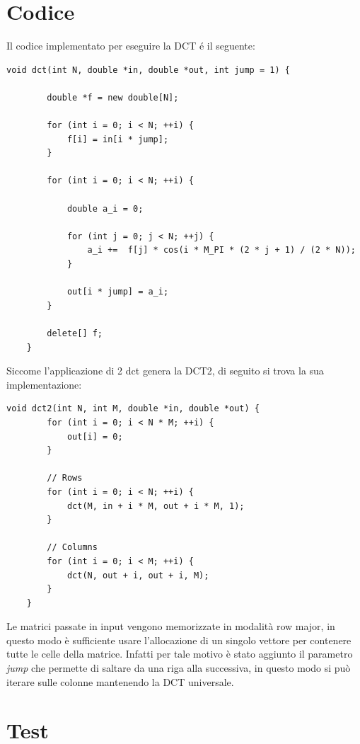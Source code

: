 \section{Codice}

Il codice implementato per eseguire la DCT é il seguente:


\begin{lstlisting}[gobble=1]
	void dct(int N, double *in, double *out, int jump = 1) {
		
		double *f = new double[N];
		
		for (int i = 0; i < N; ++i) {
			f[i] = in[i * jump];
		}
		
		for (int i = 0; i < N; ++i) {
			
			double a_i = 0;
			
			for (int j = 0; j < N; ++j) {
				a_i +=  f[j] * cos(i * M_PI * (2 * j + 1) / (2 * N));
			}
			
			out[i * jump] = a_i;
		}
		
		delete[] f;
	}
\end{lstlisting}

Siccome l'applicazione di 2 dct genera la DCT2, di seguito si trova la sua implementazione:

\begin{lstlisting}[gobble=1]
	void dct2(int N, int M, double *in, double *out) {
		for (int i = 0; i < N * M; ++i) {
			out[i] = 0;
		}
		
		// Rows
		for (int i = 0; i < N; ++i) {
			dct(M, in + i * M, out + i * M, 1);
		}
		
		// Columns
		for (int i = 0; i < M; ++i) {
			dct(N, out + i, out + i, M);
		}
	}
\end{lstlisting}

Le matrici passate in input vengono memorizzate in modalità row major, in questo modo è sufficiente usare l'allocazione di un singolo vettore per contenere tutte le celle della matrice. Infatti per tale motivo è stato aggiunto il parametro \textit{jump} che permette di saltare da una riga alla successiva, in questo modo si può iterare sulle colonne mantenendo la DCT universale.



\section{Test}

